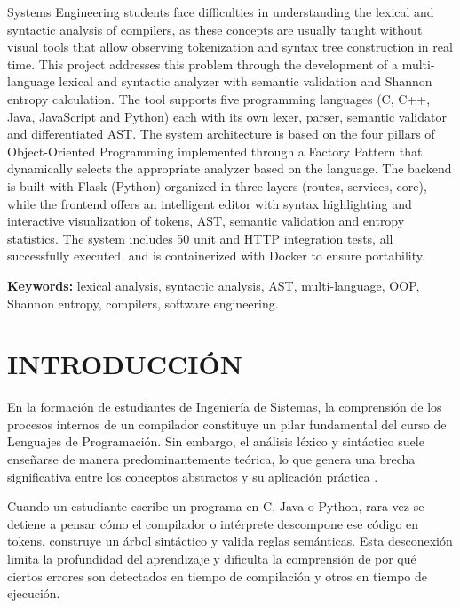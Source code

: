 \documentclass[12pt,a4paper]{article}
\begin{document}
Systems Engineering students face difficulties in understanding the lexical and syntactic analysis of compilers, as these concepts are usually taught without visual tools that allow observing tokenization and syntax tree construction in real time. This project addresses this problem through the development of a multi-language lexical and syntactic analyzer with semantic validation and Shannon entropy calculation. The tool supports five programming languages (C, C++, Java, JavaScript and Python) each with its own lexer, parser, semantic validator and differentiated AST. The system architecture is based on the four pillars of Object-Oriented Programming implemented through a Factory Pattern that dynamically selects the appropriate analyzer based on the language. The backend is built with Flask (Python) organized in three layers (routes, services, core), while the frontend offers an intelligent editor with syntax highlighting and interactive visualization of tokens, AST, semantic validation and entropy statistics. The system includes 50 unit and HTTP integration tests, all successfully executed, and is containerized with Docker to ensure portability.

\textbf{Keywords:} lexical analysis, syntactic analysis, AST, multi-language, OOP, Shannon entropy, compilers, software engineering.

\section{INTRODUCCIÓN}

En la formación de estudiantes de Ingeniería de Sistemas, la comprensión de los procesos internos de un compilador constituye un pilar fundamental del curso de Lenguajes de Programación. Sin embargo, el análisis léxico y sintáctico suele enseñarse de manera predominantemente teórica, lo que genera una brecha significativa entre los conceptos abstractos y su aplicación práctica \cite{aho2012}.

Cuando un estudiante escribe un programa en C, Java o Python, rara vez se detiene a pensar cómo el compilador o intérprete descompone ese código en tokens, construye un árbol sintáctico y valida reglas semánticas. Esta desconexión limita la profundidad del aprendizaje y dificulta la comprensión de por qué ciertos errores son detectados en tiempo de compilación y otros en tiempo de ejecución.
\end{document}
